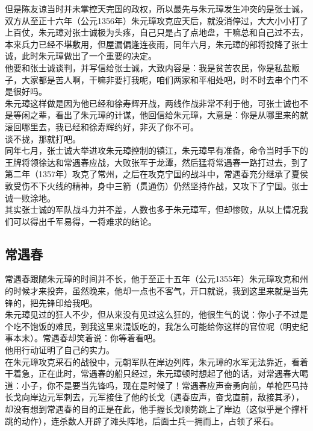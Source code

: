 \begin{multicols}{\theparacolNo}
但是陈友谅当时并未掌控天完国的政权，所以最先与朱元璋发生冲突的是张士诚，双方从至正十六年（公元1356年）朱元璋攻克应天后，就没消停过，大大小小打了上百仗，朱元璋对张士诚极为头疼，自己只是占了点地盘，干嘛总和自己过不去，本来兵力已经不堪敷用，但屋漏偏逢连夜雨，同年六月，朱元璋的部将投降了张士诚，此时朱元璋做出了一个重要的决定。\\

他要和张士诚谈判，并写信给张士诚，大致内容是：我是贫苦农民，你是私盐贩子，大家都是苦人啊，干嘛非要打我呢，咱们两家和平相处吧，时不时去串个门不是很好吗。\\

朱元璋这样做是因为他已经和徐寿辉开战，两线作战非常不利于他，可张士诚也不是等闲之辈，看出了朱元璋的计谋，他回信给朱元璋，大意是：你是从哪里来的就滚回哪里去，我已经和徐寿辉约好，非灭了你不可。\\

谈不拢，那就打吧。\\

同年七月，张士诚大举进攻朱元璋控制的镇江，朱元璋早有准备，命令当时手下的王牌将领徐达和常遇春应战，大败张军于龙潭，然后猛将常遇春一路打过去，到了第二年（1357年）攻克了常州，之后在攻克宁国的战斗中，常遇春充分继承了夏侯敦受伤不下火线的精神，身中三箭（贯通伤）仍然坚持作战，又攻下了宁国。张士诚一败涂地。\\

其实张士诚的军队战斗力并不差，人数也多于朱元璋军，但却惨败，从以上情况我们可以得出千军易得，一将难求的结论。\\

\subsection{常遇春}
常遇春跟随朱元璋的时间并不长，他于至正十五年（公元1355年）朱元璋攻克和州的时候才来投奔，虽然晚来，他却一点也不客气，开口就说，我到这里来就是当先锋的，把先锋印给我吧。\\

朱元璋见过的狂人不少，但从来没有见过这么狂的，他很生气的说：你小子不过是个吃不饱饭的难民，到我这里来混饭吃的，我怎么可能给你这样的官位呢（明史纪事本末）。常遇春却笑着说：你等着看吧。\\

他用行动证明了自己的实力。\\

在朱元璋攻克采石的战役中，元朝军队在岸边列阵，朱元璋的水军无法靠近，看着干着急，正在此时，常遇春的船只经过，朱元璋顿时想起了他的话，对常遇春大喝道：小子，你不是要当先锋吗，现在是时候了！常遇春应声奋勇向前，单枪匹马持长戈向岸边元军刺去，元军接住了他的长戈（遇春应声，奋戈直前，敌接其矛），却没有想到常遇春的目的正是在此，他手握长戈顺势跳上了岸边（这似乎是个撑杆跳的动作），连杀数人开辟了滩头阵地，后面士兵一拥而上，占领了采石。\\


\end{multicols}
